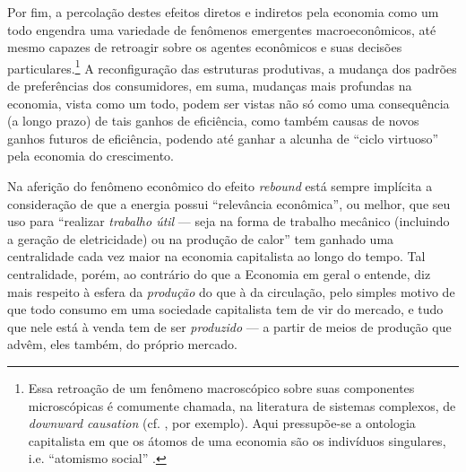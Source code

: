 Por fim, a percolação destes efeitos diretos e indiretos pela economia como um todo engendra uma variedade de fenômenos emergentes macroeconômicos, até mesmo capazes de retroagir sobre os agentes econômicos e suas decisões particulares.\footnote{Essa retroação de um fenômeno macroscópico sobre suas componentes microscópicas é comumente chamada, na literatura de sistemas complexos, de \textit{downward causation} (cf. \textcite{Kim2006}, por exemplo). Aqui pressupõe-se a ontologia capitalista em que os átomos de uma economia são os indivíduos singulares, i.e. ``atomismo social'' \parencite{Medeiros2013}.} A reconfiguração das estruturas produtivas, a mudança dos padrões de preferências dos consumidores, em suma, mudanças mais profundas na economia, vista como um todo, podem ser vistas não só como uma consequência (a longo prazo) de tais ganhos de eficiência, como também causas de novos ganhos futuros de eficiência, podendo até ganhar a alcunha de ``ciclo virtuoso'' pela economia do crescimento. 

Na aferição do fenômeno econômico do efeito \textit{rebound} está sempre implícita a consideração de que a energia possui ``relevância econômica'', ou melhor, que seu uso para ``realizar \textit{trabalho útil} — seja na forma de trabalho mecânico (incluindo a geração de eletricidade) ou na produção de calor'' \parencite[p. 1460]{Sorrell2009} tem ganhado uma centralidade cada vez maior na economia capitalista ao longo do tempo. Tal centralidade, porém, ao contrário do que a Economia em geral o entende, diz mais respeito à esfera da \textit{produção} do que à da circulação, pelo simples motivo de que todo consumo em uma sociedade capitalista tem de vir do mercado, e tudo que nele está à venda tem de ser \textit{produzido} — a partir de meios de produção que advêm, eles também, do próprio mercado.


